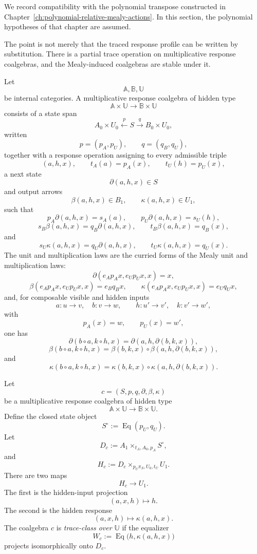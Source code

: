 We record compatibility with the polynomial transpose constructed in
Chapter~\ref{ch:polynomial-relative-mealy-actions}.  In this section, the
polynomial hypotheses of that chapter are assumed.

The point is not merely that the traced response profile can be written by
substitution.  There is a partial trace operation on multiplicative response
coalgebras, and the Mealy-induced coalgebras are stable under it.

Let
\[
\mathbb A,\mathbb B,\mathbb U
\]
be internal categories.  A multiplicative response coalgebra of hidden type
\[
\mathbb A\times\mathbb U
\longrightarrow
\mathbb B\times\mathbb U
\]
consists of a state span
\[
A_0\times U_0
\xleftarrow{p}
S
\xrightarrow{q}
B_0\times U_0,
\]
written
\[
p=(p_A,p_U),
\qquad
q=(q_B,q_U),
\]
together with a response operation assigning to every admissible triple
\[
(a,h,x),
\qquad
t_A(a)=p_A(x),
\qquad
t_U(h)=p_U(x),
\]
a next state
\[
\partial(a,h,x)\in S
\]
and output arrows
\[
\beta(a,h,x)\in B_1,
\qquad
\kappa(a,h,x)\in U_1,
\]
such that
\[
p_A\partial(a,h,x)=s_A(a),
\qquad
p_U\partial(a,h,x)=s_U(h),
\]
\[
s_B\beta(a,h,x)=q_B\partial(a,h,x),
\qquad
t_B\beta(a,h,x)=q_B(x),
\]
and
\[
s_U\kappa(a,h,x)=q_U\partial(a,h,x),
\qquad
t_U\kappa(a,h,x)=q_U(x).
\]
The unit and multiplication laws are the curried forms of the Mealy unit and
multiplication laws:
\[
\partial(e_Ap_Ax,e_Up_Ux,x)=x,
\]
\[
\beta(e_Ap_Ax,e_Up_Ux,x)=e_Bq_Bx,
\qquad
\kappa(e_Ap_Ax,e_Up_Ux,x)=e_Uq_Ux,
\]
and, for composable visible and hidden inputs
\[
a:u\to v,\quad b:v\to w,
\qquad
h:u'\to v',\quad k:v'\to w',
\]
with
\[
p_A(x)=w,
\qquad
p_U(x)=w',
\]
one has
\[
\partial(b\circ a,k\circ h,x)
=
\partial(a,h,\partial(b,k,x)),
\]
\[
\beta(b\circ a,k\circ h,x)
=
\beta(b,k,x)\circ
\beta(a,h,\partial(b,k,x)),
\]
and
\[
\kappa(b\circ a,k\circ h,x)
=
\kappa(b,k,x)\circ
\kappa(a,h,\partial(b,k,x)).
\]

\begin{definition}
\label{def:trace-class-response-coalgebra}
Let
\[
c=(S,p,q,\partial,\beta,\kappa)
\]
be a multiplicative response coalgebra of hidden type
\[
\mathbb A\times\mathbb U
\longrightarrow
\mathbb B\times\mathbb U.
\]
Define the closed state object
\[
S^\circ:=\operatorname{Eq}(p_U,q_U).
\]
Let
\[
D_c:=A_1\times_{t_A,A_0,p_A}S^\circ,
\]
and
\[
H_c:=D_c\times_{p_U\pi_S,U_0,t_U}U_1.
\]
There are two maps
\[
H_c\to U_1.
\]
The first is the hidden-input projection
\[
(a,x,h)\longmapsto h.
\]
The second is the hidden response
\[
(a,x,h)\longmapsto \kappa(a,h,x).
\]
The coalgebra \(c\) is \emph{trace-class over \(\mathbb U\)} if the equalizer
\[
W_c
:=
\operatorname{Eq}\bigl(h,\kappa(a,h,x)\bigr)
\]
projects isomorphically onto \(D_c\).
\end{definition}

